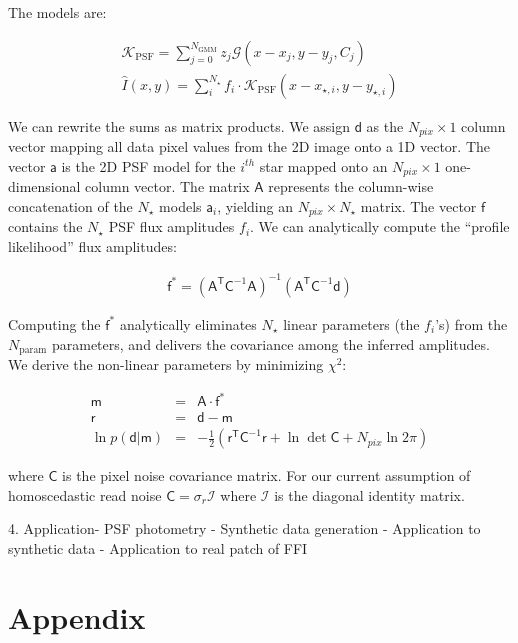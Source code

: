 \documentclass{rnaastex}
\newcommand{\vd}{\mathsf{d}}
\newcommand{\vrr}{\mathsf{r}}
\newcommand{\vm}{\mathsf{m}}
\newcommand{\vC}{\mathsf{C}}
\newcommand{\vA}{\mathsf{A}}
\newcommand{\va}{\mathsf{a}}
\newcommand{\vf}{\mathsf{f}}
\newcommand{\trans}{\mathsf{T}}
\begin{document}
The models are:

\begin{eqnarray}
\mathcal{K}_{\mathrm{PSF}} = \sum_{j=0}^{N_{\mathrm{GMM}}} z_j \mathcal{G}(x-x_j, y-y_j, C_j) \\
\hat I(x,y) = \sum_i^{N_\star} f_i \cdot \mathcal{K}_{\mathrm{PSF}}(x-x_{\star, i}, y-y_{\star, i})
\end{eqnarray}

We can rewrite the sums as matrix products.  We assign $ \vd $ as the $N_{pix} \times 1$ column vector mapping all data pixel values from the 2D image onto a 1D vector.  The vector $ \va $ is the 2D PSF model for the $i^{th}$ star mapped onto an $N_{pix} \times 1$ one-dimensional column vector.  The matrix $\vA$ represents the column-wise concatenation of the $N_{\star}$ models $\va_{i}$, yielding an $N_{pix} \times N_{\star}$ matrix.  The vector $\vf$ contains the $N_{\star}$ PSF flux amplitudes $f_i$.  We can analytically compute the ``profile likelihood'' flux amplitudes:

\begin{eqnarray}
\vf^{*} = (\vA^{\trans} \vC^{-1} \vA)^{-1}(\vA^{\trans} \vC^{-1} \vd)
\end{eqnarray}

Computing the $\vf^{*}$ analytically eliminates $N_\star$ linear parameters (the $f_i$'s) from the $N_{\mathrm{param}}$ parameters, and delivers the covariance among the inferred amplitudes.  We derive the non-linear parameters by minimizing $\chi^2$:

\begin{eqnarray}
\vm &=& \vA \cdot \vf^{*} \\
\vrr &=& \vd - \vm \\
  \ln{p(\vd | \vm)} &=& -\frac{1}{2} \left( \vrr^\trans \vC^{-1} \vrr + \ln{\det{\vC}} + N_{pix} \ln{2\pi} \right)
\end{eqnarray}

where $\vC$ is the pixel noise covariance matrix.  For our current assumption of homoscedastic read noise $\vC = \sigma_r \mathcal{I}$ where $\mathcal{I}$ is the diagonal identity matrix.


4. Application- PSF photometry
  - Synthetic data generation
  - Application to synthetic data
  - Application to real patch of FFI


\section{Appendix}
\end{document}
